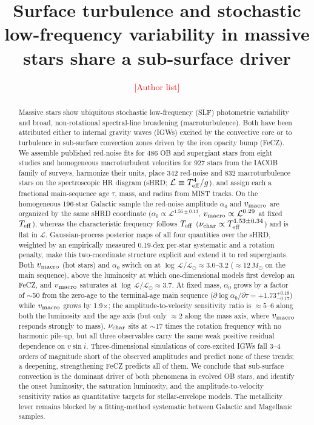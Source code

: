 \documentclass[twocolumn]{aastex631}
\newcommand{\vmac}{v_{\rm macro}}
\newcommand{\vsini}{v\sin i}
\newcommand{\teff}{T_{\rm eff}}
\newcommand{\nuchar}{\nu_{\rm char}}
\renewcommand{\ell}{\mathcal{L}}
\newcommand{\lgL}{\log\,\ell/\ell_\odot}
\newcommand{\todo}[1]{\textcolor{red}{[#1]}}
\begin{document}
\title{Surface turbulence and stochastic low-frequency variability in massive stars share a sub-surface driver}

\author{\todo{Author list}}
\affiliation{\todo{Affiliation}}

\begin{abstract}
Massive stars show ubiquitous stochastic low-frequency (SLF) photometric variability and broad, non-rotational spectral-line broadening (macroturbulence). Both have been attributed either to internal gravity waves (IGWs) excited by the convective core or to turbulence in sub-surface convection zones driven by the iron opacity bump (FeCZ). We assemble published red-noise fits for 486 OB and supergiant stars from eight studies and homogeneous macroturbulent velocities for 927 stars from the IACOB family of surveys, harmonize their units, place 342 red-noise and 832 macroturbulence stars on the spectroscopic HR diagram (sHRD; $\ell\equiv\teff^4/g$), and assign each a fractional main-sequence age $\tau$, mass, and radius from MIST tracks. On the homogeneous 196-star Galactic sample the red-noise amplitude $\alpha_0$ and $\vmac$ are organized by the same sHRD coordinate ($\alpha_0\propto\ell^{1.56\pm0.13}$, $\vmac\propto\ell^{0.29}$ at fixed $\teff$), whereas the characteristic frequency follows $\teff$ ($\nuchar\propto\teff^{1.53\pm0.34}$) and is flat in $\ell$. Gaussian-process posterior maps of all four quantities over the sHRD, weighted by an empirically measured 0.19-dex per-star systematic and a rotation penalty, make this two-coordinate structure explicit and extend it to red supergiants. Both $\vmac$ (hot stars) and $\alpha_0$ switch on at $\lgL\approx3.0$--3.2 ($\approx12\,M_\odot$ on the main sequence), above the luminosity at which one-dimensional models first develop an FeCZ, and $\vmac$ saturates at $\lgL\approx3.7$. At fixed mass, $\alpha_0$ grows by a factor of $\sim$50 from the zero-age to the terminal-age main sequence ($\partial\log\alpha_0/\partial\tau=+1.73^{+0.18}_{-0.17}$) while $\vmac$ grows by 1.9$\times$; the amplitude-to-velocity sensitivity ratio is $\approx5$--6 along both the luminosity and the age axis (but only $\approx2$ along the mass axis, where $\vmac$ responds strongly to mass). $\nuchar$ sits at $\sim$17 times the rotation frequency with no harmonic pile-up, but all three observables carry the same weak positive residual dependence on $\vsini$. Three-dimensional simulations of core-excited IGWs fall 3--4 orders of magnitude short of the observed amplitudes and predict none of these trends; a deepening, strengthening FeCZ predicts all of them. We conclude that sub-surface convection is the dominant driver of both phenomena in evolved OB stars, and identify the onset luminosity, the saturation luminosity, and the amplitude-to-velocity sensitivity ratios as quantitative targets for stellar-envelope models. The metallicity lever remains blocked by a fitting-method systematic between Galactic and Magellanic samples.
\end{abstract}
\end{document}
